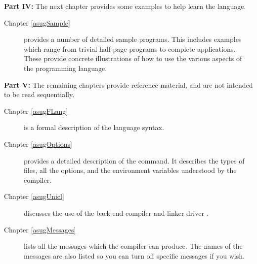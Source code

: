 {\bf Part IV:}
The next chapter provides some examples to
help learn the language.
\begin{description}
\item[Chapter \ref{asugSample}]
  provides a number of detailed sample programs.
  This includes examples which range from trivial half-page programs
  to complete applications.
  These provide concrete illustrations of how to use the various
  aspects of the programming language.
\end{description}

{\bf Part V:}
The remaining chapters provide reference material, and are not
intended to be read sequentially.
\begin{description}
\item[Chapter \ref{asugFLang}] 
  is a formal description of the language syntax.
\item[Chapter \ref{asugOptions}] 
  provides a detailed description of the  command.
  It describes the types of files, all the options, and the environment
  variables understood by the compiler.
\item[Chapter \ref{asugUnicl}]
  discusses the use of the back-end compiler and linker driver \uniclcmd{}.
\item[Chapter \ref{asugMessages}]
  lists all the messages which the compiler can produce.  The names
  of the messages are also listed so you can turn off specific messages
  if you wish.
\end{description}

